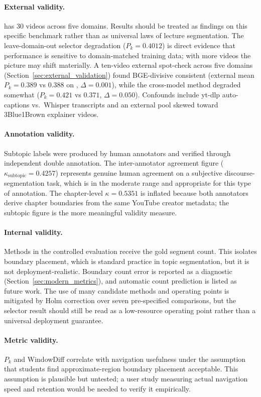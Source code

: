 \paragraph{External validity.}
\dataset{} has 30 videos across five domains. Results should be treated as
findings on this specific benchmark rather than as universal laws of lecture
segmentation. The leave-domain-out selector degradation ($P_k=0.4012$) is
direct evidence that performance is sensitive to domain-matched training data;
with more videos the picture may shift materially.
A ten-video external spot-check across five domains
(Section~\ref{sec:external_validation}) found BGE-divisive
consistent (external mean $P_k=0.389$ vs $0.388$ on \dataset{},
$\Delta=0.001$), while the cross-model method degraded somewhat
($P_k=0.421$ vs $0.371$, $\Delta=0.050$).
Confounds include yt-dlp auto-captions vs.\ Whisper transcripts
and an external pool skewed toward 3Blue1Brown explainer videos.

\paragraph{Annotation validity.}
Subtopic labels were produced by human annotators and verified through
independent double annotation. The inter-annotator agreement figure
($\kappa_{\text{subtopic}}=0.4257$) represents genuine human agreement
on a subjective discourse-segmentation task, which is in the moderate range
and appropriate for this type of annotation.
The chapter-level $\kappa=0.5351$ is inflated because both annotators derive
chapter boundaries from the same YouTube creator metadata; the subtopic figure
is the more meaningful validity measure.

\paragraph{Internal validity.}
Methods in the controlled evaluation receive the gold segment count.
This isolates boundary placement, which is standard practice in topic
segmentation, but it is not deployment-realistic.
Boundary count error is reported as a diagnostic
(Section~\ref{sec:modern_metrics}), and automatic count prediction is listed
as future work.
The use of many candidate methods and operating points is mitigated by
Holm correction over seven pre-specified comparisons, but the selector
result should still be read as a low-resource operating point rather than
a universal deployment guarantee.

\paragraph{Metric validity.}
$P_k$ and WindowDiff correlate with navigation usefulness under the assumption
that students find approximate-region boundary placement acceptable.
This assumption is plausible but untested; a user study measuring actual
navigation speed and retention would be needed to verify it empirically.

